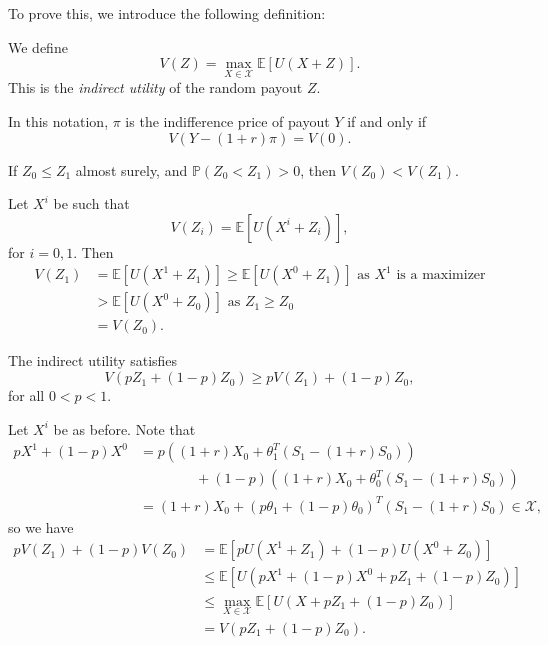 \documentclass[12pt]{article}
\begin{document}

To prove this, we introduce the following definition:
\begin{definition}
	We define
	\[
	V(Z) = \max_{X \in \mathcal{X}} \mathbb{E}[U(X+Z)].
	\]
	This is the \emph{indirect utility} of the random payout $Z$.
\end{definition}

In this notation, $\pi$ is the indifference price of payout $Y$ if and only if
\[
V(Y - (1 + r)\pi) = V(0).
\]

\begin{lemma}
	If $Z_0 \leq Z_1$ almost surely, and $\mathbb{P}(Z_0 < Z_1) > 0$, then $V(Z_0) < V(Z_1)$.
\end{lemma}

\begin{proofbox}
	Let $X^i$ be such that
	\[
	V(Z_i) = \mathbb{E}[U(X^i + Z_i)],
	\]
	for $i = 0, 1$. Then
	\begin{align*}
		V(Z_1) &= \mathbb{E}[U(X^1 + Z_1)] \geq \mathbb{E}[U(X^0 + Z_1)] \text{ as $X^1$ is a maximizer}\\
		       &> \mathbb{E}[U(X^0 + Z_0)] \text{ as  } Z_1 \geq Z_0 \\
		       &= V(Z_0).
	\end{align*}
\end{proofbox}

\begin{lemma}
	The indirect utility satisfies
	\[
	V(pZ_1 + (1-p)Z_0) \geq p V(Z_1) + (1-p)Z_0,
	\]
	for all $0 < p < 1$.
\end{lemma}

\begin{proofbox}
	Let $X^i$ be as before. Note that
	\begin{align*}
		p X^1 + (1-p) X^0 &= p((1 + r)X_0 + \theta_1^{T}(S_1 - (1+r)S_0)) \\
				  &\qquad\qquad+ (1-p)((1+r)X_0 + \theta_0^{T}(S_1 - (1+r)S_0)) \\
		&= (1+r)X_0 + (p \theta_1 + (1-p)\theta_0)^{T}(S_1 - (1+r)S_0) \in \mathcal{X},
	\end{align*}
	so we have
	\begin{align*}
		p V(Z_1) + (1-p) V(Z_0) &= \mathbb{E}[p U(X^1 + Z_1) + (1-p)U(X^0 + Z_0)] \\
					&\leq \mathbb{E}[U(pX^1 + (1-p)X^0 + p Z_1 + (1-p) Z_0)] \\
					&\leq \max_{X \in \mathcal{X}} \mathbb{E}[U(X + p Z_1 + (1-p) Z_0)] \\
					&= V(pZ_1 + (1-p)Z_0).
	\end{align*}
\end{proofbox}
\end{document}
